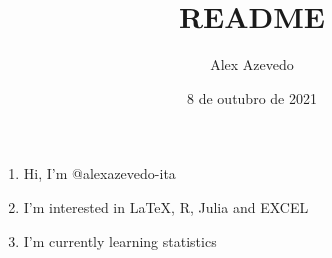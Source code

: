 \documentclass{article}
\title{README}
\author{Alex Azevedo}
\date{8 de outubro de 2021}
\begin{document}
\maketitle

\begin{enumerate}
\item[] Hi, I'm @alexazevedo-ita
\item[] I'm interested in LaTeX, R, Julia and EXCEL
\item[] I'm currently learning statistics
\end{enumerate}
\end{document}
